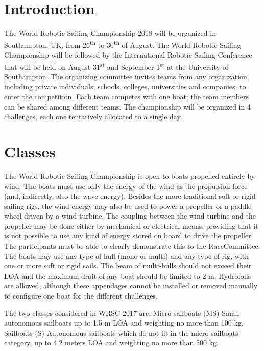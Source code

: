 \documentclass[12pt]{article}
\begin{document}
\maketitle

\section{Introduction}

The World Robotic Sailing Championship 2018 will be organized in Southampton,
UK, from 26\textsuperscript{th} to 30\textsuperscript{th} of August.
The World Robotic Sailing Championship will be followed by
the International Robotic Sailing Conference that will be held on August
31\textsuperscript{st} and September 1\textsuperscript{st} at the University of
Southampton.
The organizing committee invites teams from any organization, including private
individuals, schools, colleges, universities and companies, to enter the competition. 
Each team competes with one boat; the team members can be shared among different teams. 
The championship will be organized in 4 challenges, each one tentatively allocated to a single day.

\section{Classes}

The World Robotic Sailing Championship is open to boats propelled entirely by
wind. The boats
must use only the energy of the wind as the propulsion force (and, indirectly,
also the wave
energy). Besides the more traditional soft or rigid sailing rigs, the wind
energy may also be used
to power a propeller or a paddle-wheel driven by a wind turbine. The coupling
between the
wind turbine and the propeller may be done either by mechanical or electrical
means, providing
that it is not possible to use any kind of energy stored on board to drive the
propeller. The
participants must be able to clearly demonstrate this to the RaceCommittee.
The boats may use any type of hull (mono or multi) and any type of rig, with one
or more soft
or rigid sails. The beam of multi-hulls should not exceed their LOA and the
maximum draft of
any boat should be limited to 2 m. Hydrofoils are allowed, although these
appendages cannot
be installed or removed manually to configure one boat for the different
challenges.

The two classes considered in WRSC 2017 are:
Micro-sailboats (MS)
Small autonomous sailboats up to 1.5 m LOA and weighting no more than 100 kg.
Sailboats (S)
Autonomous sailboats which do not fit in the micro-sailboats category, up to
4.2 meters LOA and weighting no more than 500 kg.
\end{document}

